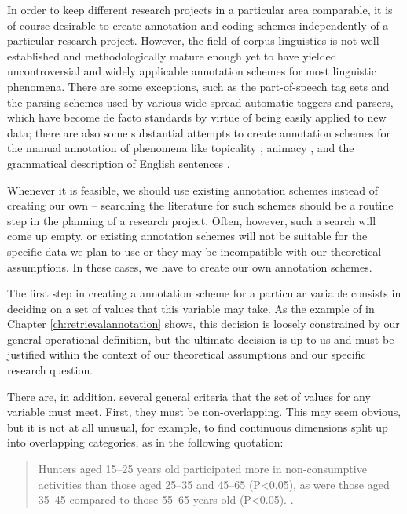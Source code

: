 In order to keep different research projects in a particular area comparable, it is of course desirable to create annotation and coding schemes independently of a particular research project. However, the field of corpus-linguistics is not well-established and methodologically mature enough yet to have yielded uncontroversial and widely applicable annotation schemes for most linguistic phenomena. There are some exceptions, such as the part-of-speech tag sets and the parsing schemes used by various wide-spread automatic taggers and parsers, which have become de facto standards by virtue of being easily applied to new data; there are also some substantial attempts to create annotation schemes for the manual annotation of phenomena like topicality \citep[cf.][]{givon_topic_1983}, animacy \citep[cf.][]{zaenen_animacy_2004}, and the grammatical description of English sentences \citep[e.g.][]{sampson_english_1995}.

Whenever it is feasible, we should use existing annotation schemes instead of creating our own -- searching the literature for such schemes should be a routine step in the planning of a research project. Often, however, such a search will come up empty, or existing annotation schemes will not be suitable for the specific data we plan to use or they may be incompatible with our theoretical assumptions. In these cases, we have to create our own annotation schemes.

The first step in creating a annotation scheme for a particular variable consists in deciding on a set of values that this variable may take. As the example of  in Chapter \ref{ch:retrievalannotation} shows, this decision is loosely constrained by our general operational definition, but the ultimate decision is up to us and must be justified within the context of our theoretical assumptions and our specific research question.

There are, in addition, several general criteria that the set of values for any variable must meet. First, they must be non-overlapping. This may seem obvious, but it is not at all unusual, for example, to find continuous dimensions split up into overlapping categories, as in the following quotation:

\begin{quote}
Hunters aged 15--25 years old participated more in non-consumptive activities than those aged 25--35 and 45--65 (P<0.05), as were those aged 35--45 compared to those 55--65 years old (P<0.05). \citep[304]{ericsson_jagare_2002}.
\end{quote}

